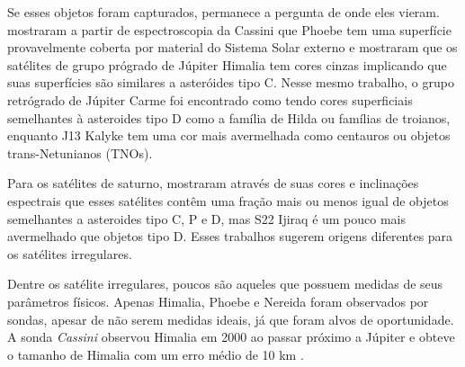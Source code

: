 \documentclass[12pt,a4paper]{report}
\begin{document}



Se esses objetos foram capturados, permanece a pergunta de onde eles vieram. \cite{Clark2005} mostraram a partir de espectroscopia da Cassini que Phoebe tem uma superfície provavelmente coberta por material do Sistema Solar externo e \cite{Grav2003} mostraram que os satélites de grupo prógrado de Júpiter Himalia tem cores cinzas implicando que suas superfícies são similares a asteróides tipo C. Nesse mesmo trabalho, o grupo retrógrado de Júpiter Carme foi encontrado como tendo cores superficiais semelhantes à asteroides tipo D como a família de Hilda ou famílias de troianos, enquanto J13 Kalyke tem uma cor mais avermelhada como centauros ou objetos trans-Netunianos (TNOs).

Para os satélites de saturno, \cite{Grav2007} mostraram através de suas cores e inclinações espectrais que esses satélites contêm uma fração mais ou menos igual de objetos semelhantes a asteroides tipo C, P e D, mas S22 Ijiraq é um pouco mais avermelhado que objetos tipo D. Esses trabalhos sugerem origens diferentes para os satélites irregulares.

Dentre os satélite irregulares, poucos são aqueles que possuem medidas de seus parâmetros físicos. Apenas Himalia, Phoebe e Nereida foram observados por sondas, apesar de não serem medidas ideais, já que foram alvos de oportunidade. A sonda \textit{Cassini} observou Himalia em 2000 ao passar próximo a Júpiter e obteve o tamanho de Himalia com um erro médio de 10 km \citep{Porco2003}.
\end{document}
